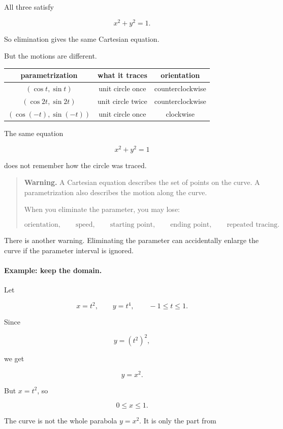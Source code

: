 All three satisfy

\[
x^2+y^2=1.
\]

So elimination gives the same Cartesian equation.

But the motions are different.

\begin{center}
\begin{tabular}{c|c|c}
\textbf{parametrization} & \textbf{what it traces} & \textbf{orientation} \\ \hline
\((\cos t,\sin t)\) & unit circle once & counterclockwise \\[3pt]
\((\cos 2t,\sin 2t)\) & unit circle twice & counterclockwise \\[3pt]
\((\cos(-t),\sin(-t))\) & unit circle once & clockwise
\end{tabular}
\end{center}

The same equation

\[
x^2+y^2=1
\]

does not remember how the circle was traced.

\begin{quote}
\textbf{Warning.}
A Cartesian equation describes the set of points on the curve.  A parametrization also
describes the motion along the curve.

When you eliminate the parameter, you may lose:

\[
\text{orientation},\qquad
\text{speed},\qquad
\text{starting point},\qquad
\text{ending point},\qquad
\text{repeated tracing}.
\]
\end{quote}

There is another warning.  Eliminating the parameter can accidentally enlarge the
curve if the parameter interval is ignored.

\paragraph{Example: keep the domain.}
Let

\[
x=t^2,
\qquad
y=t^4,
\qquad
-1\le t\le 1.
\]

Since

\[
y=(t^2)^2,
\]

we get

\[
y=x^2.
\]

But \(x=t^2\), so

\[
0\le x\le 1.
\]

The curve is not the whole parabola \(y=x^2\).  It is only the part from

